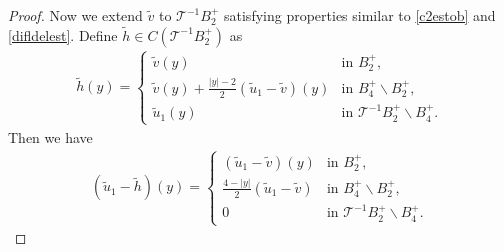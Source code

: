 \documentclass[11pt, reqno]{amsart}
\numberwithin{equation}{section}
\begin{document}
\begin{proof}
Now we extend $\tilde{v}$ to $ \mathcal{T}^{-1}B_{2}^{+}$ satisfying properties similar to \eqref{c2estob} and \eqref{difldelest}.
Define $\tilde{h}\in C(\mathcal{T}^{-1}B_{2}^{+})$ as
\begin{align*} \tilde{h}(y)=
\left\{ \begin{array}{ll}
\tilde{v}(y) & \textrm{in $B_{2}^{+}, $}\\
\tilde{v}(y)+ \frac{|y|-2}{2}(\tilde{u}_{1}-\tilde{v})(y)  & \textrm{in $B_{4}^{+} \backslash B_2^{+}$,} \\
\tilde{u}_{1}(y) & \textrm{in $\mathcal{T}^{-1}B_{2}^{+} \backslash B_{4}^{+} $}.
\end{array} \right.
\end{align*}
Then we have
\begin{align*} (\tilde{u}_{1}-\tilde{h})(y)=
\left\{ \begin{array}{ll}
(\tilde{u}_{1}-\tilde{v})(y) & \textrm{in $B_{2}^{+}, $}\\
\frac{4-|y|}{2}(\tilde{u}_{1}-\tilde{v})  & \textrm{in $B_{4}^{+} \backslash B_{2}^{+}$,} \\
0 & \textrm{in $\mathcal{T}^{-1}B_{2}^{+} \backslash B_{4}^{+} $}.
\end{array} \right.
\end{align*} 


\end{proof}
\end{document}
